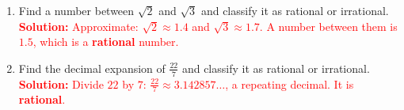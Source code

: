 \documentclass[10pt]{article}
\begin{document}
\begin{tcolorbox}[colframe=black!60, colback=white, 
coltitle=black, colbacktitle=black!15, fonttitle=\bfseries\Large, 
title=Exercises, halign title=center, left=10pt, right=10pt, top=10pt, bottom=60pt]
\begin{enumerate}[itemsep=1em]
    \item Find a number between \( \sqrt{2} \) and \( \sqrt{3} \) and classify it as rational or irrational.\\
    \textcolor{red}{\textbf{Solution:} Approximate: \( \sqrt{2} \approx 1.4 \) and \( \sqrt{3} \approx 1.7 \). A number between them is \(1.5\), which is a \textbf{rational} number.}

    \item Find the decimal expansion of \( \frac{22}{7} \) and classify it as rational or irrational.\\
    \textcolor{red}{\textbf{Solution:} Divide \(22\) by \(7\): \( \frac{22}{7} \approx 3.142857\ldots \), a repeating decimal. It is \textbf{rational}.}
\end{enumerate}
\end{tcolorbox}

\vspace{1em}
\end{document}
